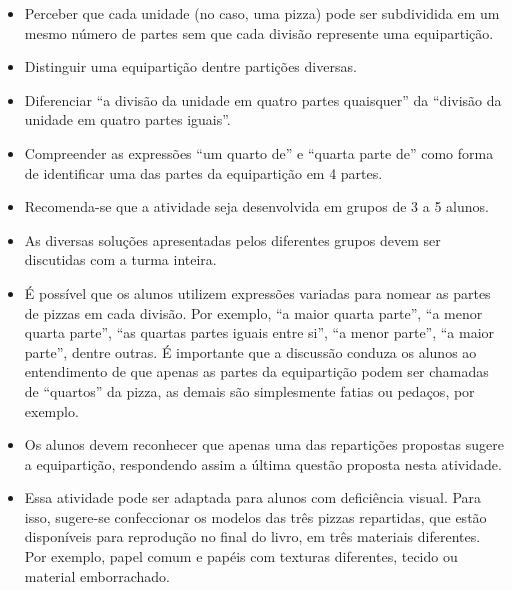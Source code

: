 \begin{multicols}{2}
\begin{itemize} %
    \item       Perceber que cada unidade (no caso, uma pizza) pode ser subdividida em um mesmo número de partes sem que cada divisão represente uma equipartição.
    \item       Distinguir uma equipartição dentre partições diversas.
    \item       Diferenciar       ``a divisão da unidade em quatro partes quaisquer'' da       ``divisão da unidade em quatro partes iguais''.
    \item       Compreender as expressões ``um quarto de'' e ``quarta parte de'' como forma de identificar uma das partes da equipartição em 4 partes.
\end{itemize} %
 \vspace{.1cm}

   \vspace{.1cm}

\begin{itemize} %
    \item       Recomenda-se que a atividade seja desenvolvida em grupos de 3 a 5 alunos.
    \item       As diversas soluções apresentadas pelos diferentes grupos devem ser discutidas com a turma inteira.
    \item       É possível que os alunos utilizem expressões variadas para nomear as partes de pizzas em cada divisão. Por exemplo,       ``a maior quarta parte'',       ``a menor quarta parte'',       ``as quartas partes iguais entre si'',       ``a menor parte'',       ``a maior parte'', dentre outras. É importante que a discussão conduza os alunos ao entendimento de que apenas as partes da equipartição podem ser chamadas de       ``quartos'' da pizza, as demais são simplesmente fatias ou pedaços, por exemplo.
    \item       Os alunos devem reconhecer que apenas uma das repartições propostas sugere a equipartição, respondendo assim a última questão proposta nesta atividade.
    \item       Essa atividade pode ser adaptada para alunos com deficiência visual. Para isso, sugere-se confeccionar os modelos das três pizzas repartidas, que estão disponíveis para reprodução no final do livro, em três materiais diferentes. Por exemplo, papel comum e papéis com texturas diferentes, tecido ou material emborrachado.
\end{itemize} %



\end{multicols}

